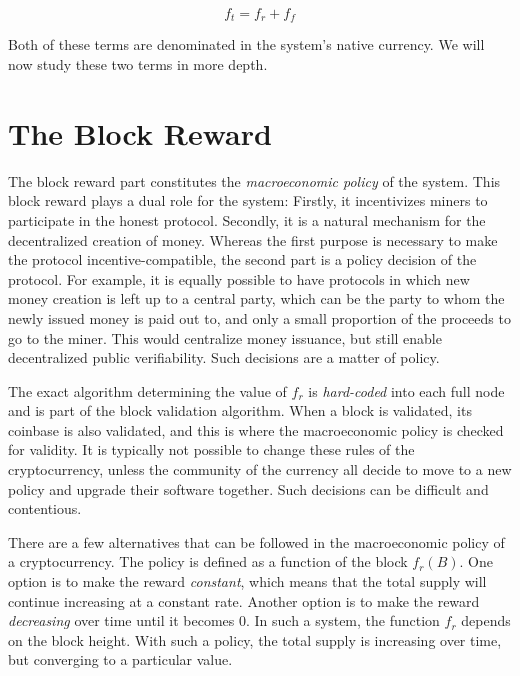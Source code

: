 \[
    f_t = f_r + f_f
\]

Both of these terms are denominated in the system's native currency. We
will now study these two terms in more depth.

\section{The Block Reward}
The block reward part constitutes the \emph{macroeconomic policy} of the
system. This block reward plays a dual role for the system: Firstly, it
incentivizes miners to participate in the honest protocol. Secondly, it
is a natural mechanism for the decentralized creation of money. Whereas
the first purpose is necessary to make the protocol incentive-compatible,
the second part is a policy decision of the protocol. For example, it is
equally possible to have protocols in which new money creation is left up
to a central party, which can be the party to whom the newly issued money
is paid out to, and only a small proportion of the proceeds to go to the
miner. This would centralize money issuance, but still enable decentralized
public verifiability. Such decisions are a matter of policy.

The exact algorithm determining the value of $f_r$ is \emph{hard-coded}
into each full node and is part of the block validation algorithm. When
a block is validated, its coinbase is also validated, and this is where
the macroeconomic policy is checked for validity. It is typically not
possible to change these rules of the cryptocurrency, unless the community
of the currency all decide to move to a new policy and upgrade their software
together. Such decisions can be difficult and contentious.


There are a few alternatives that can be followed in the macroeconomic
policy of a cryptocurrency. The policy is defined as a function of the
block $f_r(B)$. One option is to make the reward \emph{constant}, which
means that the total supply will continue increasing at a constant rate.
Another option is to make the reward \emph{decreasing} over time until
it becomes $0$. In such a system, the function $f_r$ depends on the block
height. With such a policy, the total supply is increasing over time, but
converging to a particular value.

